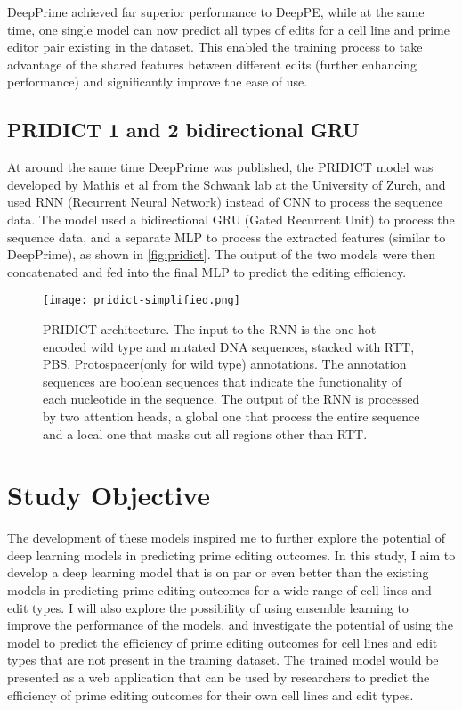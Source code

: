 DeepPrime achieved far superior performance to DeepPE, while at the same time, one single model can now predict all types of edits for a cell line and prime editor pair existing in the dataset. This enabled the training process to take advantage of the shared features between different edits (further enhancing performance) and significantly improve the ease of use.

\subsection{PRIDICT 1 and 2 bidirectional GRU}

At around the same time DeepPrime was published, the PRIDICT model was developed by Mathis et al from the Schwank lab at the University of Zurch, and used RNN (Recurrent Neural Network) instead of CNN to process the sequence data\cite{mathisPredictingPrimeEditing2023}. The model used a bidirectional GRU (Gated Recurrent Unit) to process the sequence data, and a separate MLP to process the extracted features (similar to DeepPrime), as shown in \autoref{fig:pridict}. The output of the two models were then concatenated and fed into the final MLP to predict the editing efficiency.

\begin{figure}
    \centering
    \texttt{[image: pridict-simplified.png]}
    \caption[PRIDICT architecture]{PRIDICT architecture. The input to the RNN is the one-hot encoded wild type and mutated DNA sequences, stacked with RTT, PBS, Protospacer(only for wild type) annotations. The annotation sequences are boolean sequences that indicate the functionality of each nucleotide in the sequence. The output of the RNN is processed by two attention heads, a global one that process the entire sequence and a local one that masks out all regions other than RTT. }
    \label{fig:pridict}
\end{figure}

\section{Study Objective}

The development of these models inspired me to further explore the potential of deep learning models in predicting prime editing outcomes. In this study, I aim to develop a deep learning model that is on par or even better than the existing models in predicting prime editing outcomes for a wide range of cell lines and edit types. I will also explore the possibility of using ensemble learning to improve the performance of the models, and investigate the potential of using the model to predict the efficiency of prime editing outcomes for cell lines and edit types that are not present in the training dataset. The trained model would be presented as a web application that can be used by researchers to predict the efficiency of prime editing outcomes for their own cell lines and edit types.